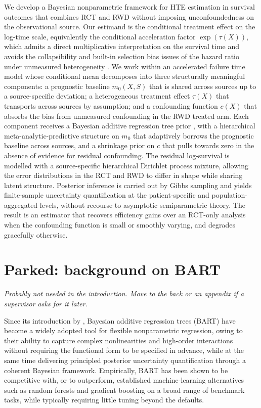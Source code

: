 We develop a Bayesian nonparametric framework for HTE estimation in survival outcomes that combines RCT and RWD without imposing unconfoundedness on the observational source.
Our estimand is the conditional treatment effect on the log-time scale, equivalently the conditional acceleration factor $\exp(\tau(X))$, which admits a direct multiplicative interpretation on the survival time and avoids the collapsibility and built-in selection bias issues of the hazard ratio under unmeasured heterogeneity \citep{Brathovde2024}.
We work within an accelerated failure time model whose conditional mean decomposes into three structurally meaningful components: a prognostic baseline $m_0(X, S)$ that is shared across sources up to a source-specific deviation; a heterogeneous treatment effect $\tau(X)$ that transports across sources by assumption; and a confounding function $c(X)$ that absorbs the bias from unmeasured confounding in the RWD treated arm.
Each component receives a Bayesian additive regression tree prior \citep{chipman2010bart}, with a hierarchical meta-analytic-predictive structure on $m_0$ that adaptively borrows the prognostic baseline across sources, and a shrinkage prior on $c$ that pulls towards zero in the absence of evidence for residual confounding.
The residual log-survival is modelled with a source-specific hierarchical Dirichlet process mixture, allowing the error distributions in the RCT and RWD to differ in shape while sharing latent structure.
Posterior inference is carried out by Gibbs sampling and yields finite-sample uncertainty quantification at the patient-specific and population-aggregated levels, without recourse to asymptotic semiparametric theory.
The result is an estimator that recovers efficiency gains over an RCT-only analysis when the confounding function is small or smoothly varying, and degrades gracefully otherwise.


\section*{Parked: background on BART}

\textit{Probably not needed in the introduction.
Move to the back or an appendix if a supervisor asks for it later.}

Since its introduction by \citet{chipman2010bart}, Bayesian additive regression trees (BART) have become a widely adopted tool for flexible nonparametric regression, owing to their ability to capture complex nonlinearities and high-order interactions without requiring the functional form to be specified in advance, while at the same time delivering principled posterior uncertainty quantification through a coherent Bayesian framework.
Empirically, BART has been shown to be competitive with, or to outperform, established machine-learning alternatives such as random forests and gradient boosting on a broad range of benchmark tasks, while typically requiring little tuning beyond the defaults.
